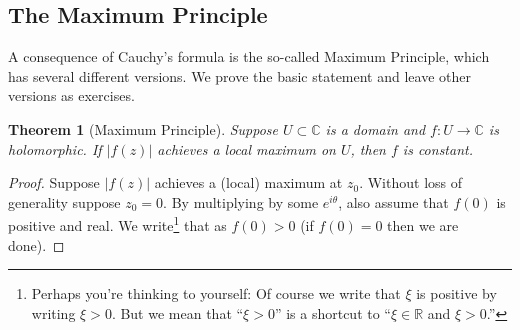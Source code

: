 \documentclass[12pt,openany]{book}
\newcommand{\sabs}[1]{\lvert {#1} \rvert}
\newcommand{\C}{{\mathbb{C}}}
\newcommand{\R}{{\mathbb{R}}}
\theoremstyle{plain}
\newtheorem{thm}{Theorem}[section]
\theoremstyle{remark}
\theoremstyle{definition}
\theoremstyle{exercise}
\theoremstyle{example}
\begin{document}
\subsection{The Maximum Principle}

A consequence of Cauchy's formula is the so-called Maximum Principle, which
has several different versions.  We prove the basic statement and leave
other versions as exercises.

\begin{thm}[Maximum Principle]
Suppose $U \subset \C$ is a domain and
$f \colon U \to \C$ is holomorphic.
If $\sabs{f(z)}$ achieves a local maximum on $U$, then $f$ is constant.
\end{thm}

\begin{proof}
Suppose $\sabs{f(z)}$ achieves a (local) maximum at $z_0$.
Without loss of generality suppose $z_0 = 0$.  By multiplying by some
$e^{i\theta}$, also assume that $f(0)$ is positive and real.
We write\footnote{%
Perhaps you're thinking to yourself: Of course we write that $\xi$ is
positive by writing $\xi > 0$.  But we mean that ``$\xi > 0$''
is a shortcut to ``$\xi \in \R$ and $\xi > 0$.''}
that as $f(0) > 0$ (if $f(0) = 0$ then we are done).


\end{proof}
\end{document}
